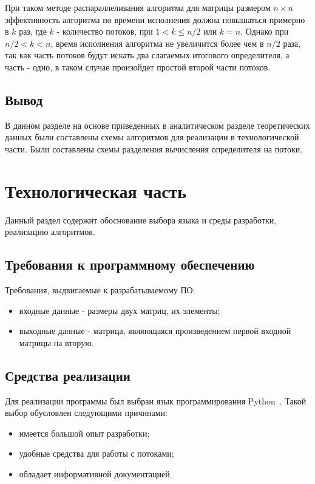 \documentclass[12pt]{report}
\begin{document}
    При таком методе распараллеливания алгоритма для матрицы размером $n \times n$ эффективность
    алгоритма по времени исполнения должна повышаться примерно в $k$ раз, где $k$ - количество потоков,
    при $1 < k \leq n / 2$ или $k = n$.
    Однако при $ n / 2 < k < n$, время исполнения алгоритма не увеличится более чем в $n / 2$ раза,
    так как часть потоков будут искать два слагаемых итогового определителя, а часть - одно,
    в таком случае произойдет простой второй части потоков.


    \section{Вывод}
    В данном разделе на основе приведенных в аналитическом разделе теоретических данных
    были составлены схемы алгоритмов для реализации в технологической части.
    Были составлены схемы разделения вычисления определителя на потоки.
    \newpage


    \chapter{Технологическая часть}
    Данный раздел содержит обоснование выбора языка и среды разработки, реализацию алгоритмов.


    \section{Требования к программному обеспечению}
    Требования, выдвигаемые к разрабатываемому ПО:
    \begin{itemize}
        \item входные данные - размеры двух матриц, их элементы;
        \item выходные данные - матрица, являющаяся произведением первой входной матрицы на вторую.
    \end{itemize}


    \section{Средства реализации}
    Для реализации программы был выбран язык программирования Python~\cite{Python}.
    Такой выбор обусловлен следующими причинами:
    \begin{itemize}
        \item имеется большой опыт разработки;
        \item удобные средства для работы с потоками;
        \item обладает информативной документацией.
    \end{itemize}
\end{document}
